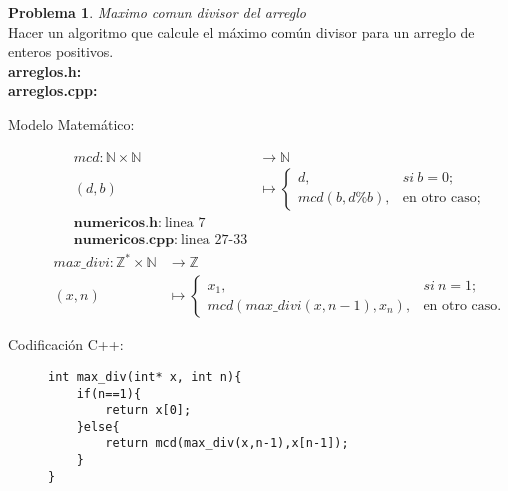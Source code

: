 \documentclass{article}
\theoremstyle{plain}
\theoremstyle{definition}
\newtheorem{problem}{Problema}
\begin{document}
\begin{problem} \emph{Maximo comun divisor del arreglo}\\
Hacer un algoritmo que calcule el máximo común divisor para un arreglo de enteros positivos.\\
\textbf{arreglos.h:}\ \\
\textbf{arreglos.cpp:}\ 
%
\begin{description}
\item[Modelo Matemático:]
%
\begin{align*}
mcd: \mathbb{N}\times\mathbb{N} &\to \mathbb{N}\\
(d,b) &\mapsto
\begin{cases}
d,& si\ b=0;\\
mcd(b,d\%b),& \text{en otro caso;}
\end{cases}\\
\textbf{numericos.h:}\ \text{linea 7}\\
\textbf{numericos.cpp:}\ \text{linea 27-33}
\end{align*}
\begin{align*}
max\_divi: \mathbb{Z}^*\times\mathbb{N} &\to \mathbb{Z}\\
(x,n) &\mapsto
\begin{cases}
x_1,& si\ n=1;\\
mcd(max\_divi(x,n-1),x_n),& \text{en otro caso.}
\end{cases}
\end{align*}
%
\item[Codificación \textsf{C++}:]\hfill
%
\begin{verbatim}
int max_div(int* x, int n){
    if(n==1){
        return x[0];
    }else{
        return mcd(max_div(x,n-1),x[n-1]);
    }
}
\end{verbatim}
\end{description}
\end{problem}
\end{document}
